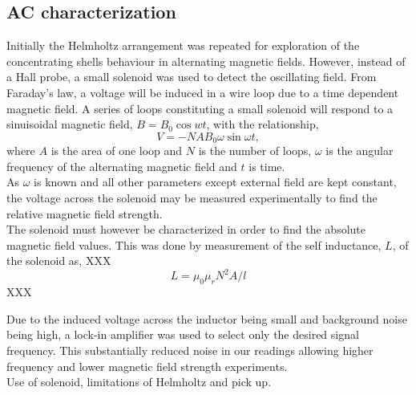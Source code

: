 \documentclass[11pt]{iopart}
\begin{document}
\subsection{AC characterization}
Initially the Helmholtz arrangement was repeated for exploration of
the concentrating shells behaviour in alternating magnetic
fields. However, instead of a Hall probe, a small solenoid was used to
detect the oscillating field. From Faraday's law, a voltage will be
induced in a wire loop due to a time dependent magnetic field. A
series of loops constituting a small solenoid will respond to a
sinuisoidal magnetic field, $B = B_0\cos{wt}$, with the relationship,
\begin{equation}
  V = -NAB_0\omega\sin{\omega t},
  \label{eqn:far}
\end{equation}
where $A$ is the area of one loop and $N$ is the number of loops,
$\omega$ is the angular frequency of the alternating magnetic field
and $t$ is time.\\ As $\omega$ is known and all other parameters
except external field are kept constant, the voltage across the
solenoid may be measured experimentally to find the relative magnetic
field strength.\\
The solenoid must however be characterized in order to find the
absolute magnetic field values. This was done by measurement of the
self inductance, $L$, of the solenoid as, XXX
\begin{equation}
  L = \mu_0\mu_rN^2A/l
\end{equation}
XXX

Due to the induced voltage across the inductor being small and
background noise being high, a lock-in amplifier was used to select
only the desired signal frequency. This substantially reduced noise in
our readings allowing higher frequency and lower magnetic field
strength experiments.\\
Use of solenoid, limitations of Helmholtz and pick up.
\end{document}
